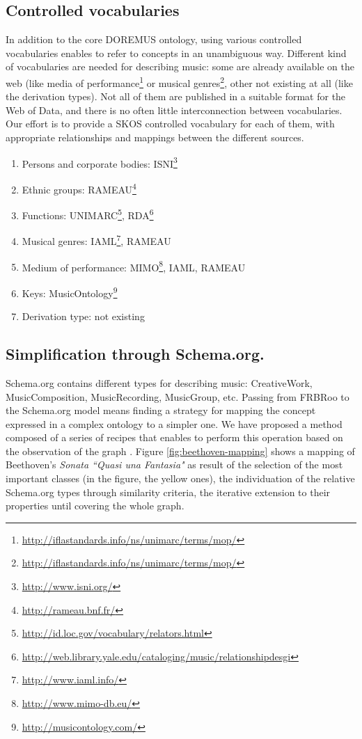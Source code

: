 \documentclass{llncs}
\begin{document}
\subsection{Controlled vocabularies}
In addition to the core DOREMUS ontology, using various controlled vocabularies enables to refer to concepts in an unambiguous way. Different kind of vocabularies are needed for describing music: some are already available on the web (like media of performance\footnote{\url{http://iflastandards.info/ns/unimarc/terms/mop/}} or musical genres\footnote{\url{http://iflastandards.info/ns/unimarc/terms/mop/}}, other not existing at all (like the derivation types).
Not all of them are published in a suitable format for the Web of Data, and there is no often little interconnection between vocabularies. Our effort is to provide a SKOS controlled vocabulary for each of them, with appropriate relationships and mappings between the different sources.
\begin{enumerate}
\item{Persons and corporate bodies: ISNI\footnote{\url{http://www.isni.org/}}}
\item{Ethnic groups: RAMEAU\footnote{\url{http://rameau.bnf.fr/}}}
\item{Functions: UNIMARC\footnote{\url{http://id.loc.gov/vocabulary/relators.html}}, RDA\footnote{\url{http://web.library.yale.edu/cataloging/music/relationshipdesgi}}}
\item{Musical genres: IAML\footnote{\url{http://www.iaml.info/}}, RAMEAU}
\item{Medium of performance: MIMO\footnote{\url{http://www.mimo-db.eu/}}, IAML, RAMEAU}
\item{Keys: MusicOntology\footnote{\url{http://musicontology.com/}}}
\item{Derivation type: not existing}
\end{enumerate}

\subsection{Simplification through Schema.org.}

Schema.org contains different types for describing music: CreativeWork, MusicComposition, MusicRecording, MusicGroup, etc. Passing from FRBRoo to the Schema.org model means finding a strategy for mapping the concept expressed in a complex ontology to a simpler one. We have proposed a method composed of a series of recipes that enables to perform this operation based on the observation of the graph \cite{lisena2016mapping}. Figure \ref{fig:beethoven-mapping} shows a mapping of Beethoven's \textit{Sonata ``Quasi una Fantasia"} as result of the selection of the most important classes (in the figure, the yellow ones), the individuation of the relative Schema.org types through similarity criteria, the iterative extension to their properties until covering the whole graph. 
\end{document}
